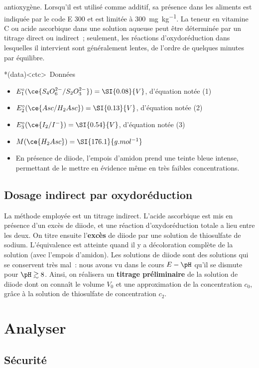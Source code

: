\documentclass[../main/main.tex]{subfiles}
\begin{document}
{	antioxygène. Lorsqu'il est utilisé comme additif, sa présence dans les
	aliments est indiquée par le code E 300 et est limitée à \SI{300}{mg.kg^{-1}}.
	La teneur en vitamine C ou acide ascorbique dans une solution aqueuse peut
	être déterminée par un titrage direct ou indirect~; seulement, les réactions
	d'oxydoréduction dans lesquelles il intervient sont généralement lentes, de
	l'ordre de quelques minutes par équilibre.
	\begin{tcn}*(data)<ctc>{\icondata~Données}
		\begin{itemize}
			\item $E_1^\circ (\ce{S_4O_6^{2-}/S_2O_3^{2-}}) = \SI{0.08}{V}$,
			      d'équation notée (1)
			\item $E_2^\circ (\ce{Asc/H_2Asc}) = \SI{0.13}{V}$, d'équation notée (2)
			\item $E_3^\circ (\ce{I_2/I^{-}}) = \SI{0.54}{V}$, d'équation notée (3)
			\item $M(\ce{H_2Asc}) = \SI{176.1}{g.mol^{-1}}$
			\item En présence de diiode, l'empois d'amidon prend une teinte bleue
			      intense, permettant de le mettre en évidence même en très faibles
			      concentrations.
		\end{itemize}
	\end{tcn}

	\subsection{Dosage indirect par oxydoréduction}
	La méthode employée est un titrage indirect. L'acide ascorbique est mis en
	présence d'un excès  de diiode, et une réaction d'oxydoréduction
	totale a lieu entre les deux. On titre ensuite l'\textbf{excès} de diiode par
	une solution de thiosulfate de sodium. L'équivalence est atteinte quand il y a
	décoloration complète de la solution (avec l'empois d'amidon).
	\bigbreak
	Les solutions de diiode sont des solutions qui se conservent très mal~: nous
	avons vu dans le cours $E-\pH$ qu'il se dismute pour $\pH \gtrsim 8$. Ainsi,
	on réalisera un \textbf{titrage préliminaire} de la solution de diiode dont on
	connaît le volume $V_0$ et une approximation de la concentration $c_0$, grâce
	à la solution de thiosulfate de concentration $c_2$.
}%

\section{Analyser}
\subsection{Sécurité}
\end{document}
